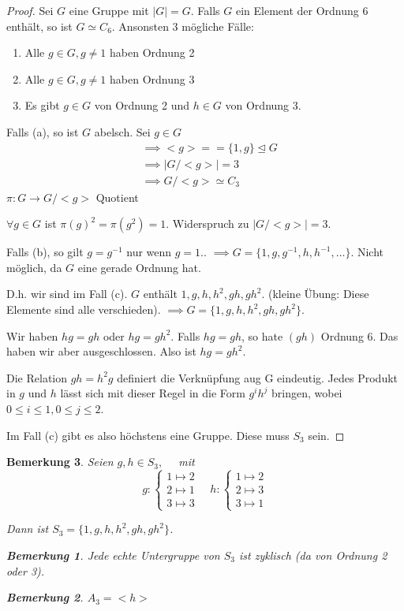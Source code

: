 \documentclass{article}
\theoremstyle{plain}
\newtheorem{bemerkung}{Bemerkung}
\newcommand{\normal}{\trianglelefteq}
\newcommand{\zykl}[1]{{<}{#1}{>}}
\newcommand{\iso}{\simeq}
\begin{document}
\begin{proof}
    Sei $G$ eine Gruppe mit $|G|=G$. Falls $G$ ein Element der Ordnung 6 enthält, so ist $G\iso C_6$.
    Ansonsten 3 mögliche Fälle:
    \begin{enumerate}[label=(\alph*)]
        \item Alle $g\in G, g\neq 1$ haben Ordnung 2
        \item Alle $g\in G, g\neq 1$ haben Ordnung 3
        \item Es gibt $g\in G$ von Ordnung 2 und $h\in G$ von Ordnung 3.
    \end{enumerate}
    Falls (a), so ist $G$ abelsch. Sei $g\in G$ 
    \begin{align*}
    &\implies \zykl{g}==\{1,g\}\normal G\\
    &\implies |G/\zykl{g}|=3\\
    &\implies G/\zykl{g}\iso C_3
    \end{align*}
    $\pi\colon G\to G/\zykl{g}$ Quotient 
    
    $\forall g\in G$ ist $\pi(g)^2=\pi(g^2)=1$. Widerspruch zu $|G/\zykl{g}|=3$.
    
    Falls (b), so gilt $g=g^{-1}$ nur wenn $g=1$..
    $\implies G=\{1,g,g^{-1}, h, h^{-1}, \ldots\}$. Nicht möglich, da $G$ eine gerade Ordnung hat.

    D.h. wir sind im Fall (c). 
    $G$ enthält $1,g,h,h^2,gh,gh^2$. (kleine Übung: Diese Elemente sind alle verschieden).
    $\implies G=\{1,g,h,h^2,gh,gh^2\}$.
    
    Wir haben $hg=gh$ oder $hg=gh^2$.
    Falls $hg=gh$, so hate $(gh)$ Ordnung 6.
    Das haben wir aber ausgeschlossen. Also ist $hg=gh^2$.
    
    Die Relation $gh=h^2g$ definiert die Verknüpfung aug G eindeutig.
    Jedes Produkt in $g$ und $h$ lässt sich mit dieser Regel in die Form $g^i h^j$ bringen, wobei $0\leq i\leq 1, 0\leq j \leq 2$.

    Im Fall (c) gibt es also höchstens eine Gruppe. Diese muss $S_3$ sein.
\end{proof}

\begin{bemerkung}
    Seien $g,h\in S_3, \quad$ mit
    $$g\colon\begin{cases}
    1\mapsto2\\
    2\mapsto1\\
    3\mapsto3
    \end{cases}\quad
    h\colon\begin{cases}
        1\mapsto2\\
        2\mapsto3\\
        3\mapsto1
    \end{cases}$$
    
    Dann ist $S_3=\{1,g,h,h^2,gh,gh^2\}$.
    \begin{bemerkung}
        Jede echte Untergruppe von $S_3$ ist zyklisch (da von Ordnung 2 oder 3).
    \end{bemerkung}
    \begin{bemerkung}
        $A_3=\zykl{h}$
    \end{bemerkung}
\end{bemerkung}
\end{document}
